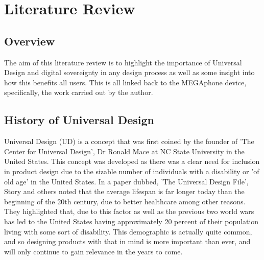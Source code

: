 
\chapter{Literature Review} %

\label{Chapter2} %


\section{Overview}  
The aim of this literature review is to highlight the importance of Universal Design and digital sovereignty in any design process as well as some insight into how this benefits all users. 
This is all linked back to the MEGAphone device, specifically, the work carried out by the author. %


\section{History of Universal Design}
Universal Design (UD) is a concept that was first coined by the founder of 'The Center for Universal Design', Dr Ronald Mace at NC State University in the United States\cite{ronald}.
This concept was developed as there was a clear need for inclusion in product design due to the sizable number of individuals with a disability or 'of old age' in the United States. %
In a paper dubbed, 'The Universal Design File'\cite{universalfile}, Story and others noted that the average lifespan is far longer today than the beginning of the 20th century, due to better healthcare among other reasons.
They highlighted that, due to this factor as well as the previous two world wars has led to the United States having approximately 20 percent of their population living with some sort of disability.
This demographic is actually quite common, and so designing products with that in mind is more important than ever, and will only continue to gain relevance in the years to come.

